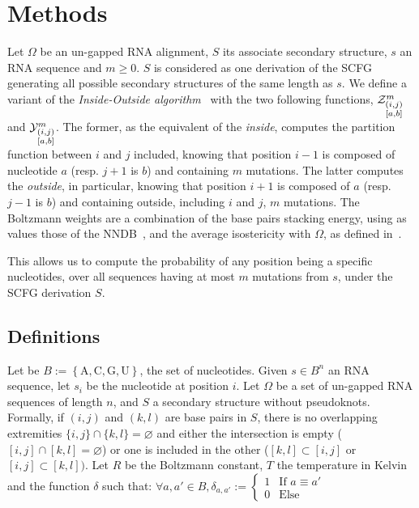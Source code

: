 \section{Methods}
\label{sec:methods}
Let $\Omega$ be an un-gapped RNA alignment, $S$ its associate secondary structure, $s$ an RNA 
sequence and $m\geq 0$. $S$ is considered as  one derivation of the SCFG generating  
all possible secondary structures of the same length as $s$. We define a variant of the
 \emph{Inside-Outside algorithm}~\cite{Lari1990} with the two following functions,
$\Z{i,j}{m}{a,b}$ and $\Y{i,j}{m}{a,b}$. The former, as the 
equivalent of the \emph{inside}, computes the partition function between $i$ and $j$ included, 
knowing that position $i-1$ is composed of nucleotide $a$ (resp. $j+1$ is $b$) and containing $m$ mutations. The latter computes the \emph{outside}, in particular, knowing 
that position $i+1$ is composed of $a$ (resp. $j-1$ is $b$) and containing outside,
including $i$ and $j$, $m$ mutations.
The Boltzmann weights are a combination of the base pairs stacking energy, 
using as values those of the NNDB~\cite{Turner2010}, and
the average isostericity with $\Omega$, as defined in~\cite{Stombaugh2009}. 

This allows us to compute the probability of any position being a specific nucleotides,
over all sequences having at most $m$ mutations from $s$, under the SCFG derivation $S$.

\subsection{Definitions}
Let be $B:=\left\{\text{A},\text{C},\text{G},\text{U}\right\}$, the set of nucleotides.
Given $s\in B^n$ an RNA sequence, let $s_i$ be the nucleotide at position $i$. Let $\Omega$ be a set of un-gapped RNA sequences of
length $n$, and $S$ a secondary structure without pseudoknots. 
Formally, if $(i,j)$ and $(k,l)$ are base pairs in $S$, there is no overlapping extremities
 $\{i,j\}\cap \{k,l\}=\varnothing$ and either the intersection is empty 
 ($[i,j]\cap[k,l]=\varnothing$) or one is included in the other ($[k,l]\subset[i,j]$ or 
 $[i,j]\subset[k,l])$. Let $R$ be the Boltzmann constant, $T$ the temperature in Kelvin and
  the function $\delta$ such that: 
 $\forall a,a' \in B, \delta_{a,a'}:=\left\{\begin{array}{ll}
															1 & \text{If } a\equiv a'\\
															0 & \text{Else}
														\end{array}\right.$

